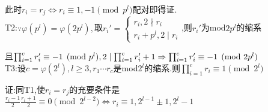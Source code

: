 此时$ r_i=r_j\Leftrightarrow r_i\equiv 1,-1\pmod{p^l}$配对即得证.
\\

T2:$ \because \varphi(p^l)=\varphi(2p^l),$取$ r_i'=\left\{ \begin{matrix}r_i,2 \nmid r_i\\ r_i+p^l,2\mid r_i\end{matrix} \right.$,则$ r_i'$为mod$ 2p^l$的缩系

且$ \prod_{i=1}^{c}{r_i'}\equiv -1 \pmod{p^l},2 \mid  \prod_{i=1}^{c}{r_i'}+1\Rightarrow  \prod_{i=1}^{c}{r_i'}\equiv -1 \pmod{2p^l}\\$
\\

T3:设$ c=\varphi(2^l),l\ge 3,r_1\cdots r_c$是mod$ 2^l$的缩系.则$  \prod_{i=1}^{c}{r_i}\equiv 1 \pmod{2^l}$

证:同T1,使$ r_i=r_j$的充要条件是$ \frac{r_i-1}{2}\frac{r_i+1}{2}\equiv 0 \pmod{2^{l-2}}\Leftrightarrow r_i\equiv 1,2^{l-1}\pm 1,2^l-1$
